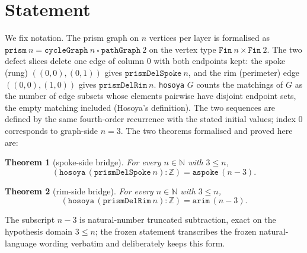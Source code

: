 \documentclass[11pt]{article}
\newtheorem{theorem}{Theorem}
\begin{document}
\section{Statement}\label{sec:statement}

We fix notation. The prism graph on $n$ vertices per layer is formalised as
$\mathtt{prism}\ n = \mathtt{cycleGraph}\ n\ \square\ \mathtt{pathGraph}\ 2$
on the vertex type $\texttt{Fin}\ n \times \texttt{Fin}\ 2$. The two defect
slices delete one edge of column 0 with both endpoints kept:
the spoke (rung) $((0,0),(0,1))$ gives $\mathtt{prismDelSpoke}\ n$, and the
rim (perimeter) edge $((0,0),(1,0))$ gives $\mathtt{prismDelRim}\ n$.
\texttt{hosoya} $G$ counts the matchings of $G$ as the number of edge subsets
whose elements pairwise have disjoint endpoint sets, the empty matching
included (Hosoya's definition). The two sequences are defined by the same
fourth-order recurrence with the stated initial values; index $0$ corresponds
to graph-side $n = 3$. The two theorems formalised and proved here are:

\begin{theorem}[spoke-side bridge]\label{thm:spoke}
For every $n \in \mathbb{N}$ with $3 \le n$,
\[
(\mathtt{hosoya}\,(\mathtt{prismDelSpoke}\ n) : \mathbb{Z}) = \mathtt{aspoke}\,(n-3).
\]
\end{theorem}

\begin{theorem}[rim-side bridge]\label{thm:rim}
For every $n \in \mathbb{N}$ with $3 \le n$,
\[
(\mathtt{hosoya}\,(\mathtt{prismDelRim}\ n) : \mathbb{Z}) = \mathtt{arim}\,(n-3).
\]
\end{theorem}

\noindent The subscript $n-3$ is natural-number truncated subtraction, exact
on the hypothesis domain $3 \le n$; the frozen statement transcribes the
frozen natural-language wording verbatim and deliberately keeps this form.
\end{document}
